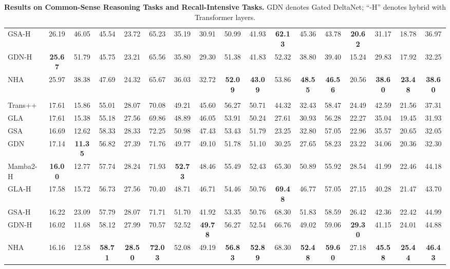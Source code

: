 \begin{table}[t!]
\begin{adjustbox}{width=1.05\textwidth, center}
\begin{small}
\begin{tabular}{lcc|cccccc>{\columncolor{red!7}}c|cccccc>{\columncolor{red!7}}c}
        GSA-H    & 26.19 & 46.05 & 45.54 & 23.72 & 65.23 & 35.19 & 30.91 & 50.99 & 41.93 & \textbf{62.13} & 45.36 & 43.78 & \textbf{20.62} & 31.17 & 18.78 & 36.97 \\
        GDN-H    & \textbf{25.67} & 51.79 & 45.75 & 23.21 & 65.56 & 35.80 & 29.30 & 51.38 & 41.83 & 52.32 & 38.80 & 39.40 & 15.24 & 29.83 & 17.92 & 32.25 \\
        NHA      & 25.97 & 38.38 & 47.69 & 24.32 & 65.67 & 36.03 & 32.72 & \textbf{52.09} & \textbf{43.09} & 53.86 & \textbf{48.55} & \textbf{46.56} & 20.56 & \textbf{38.60} & \textbf{23.48} & \textbf{38.60} \\
        \midrule
        \rowcolor{gray!15}\multicolumn{17}{l}{\textbf{\textit{1.3B Params 100B Tokens}}} \\
        Trans++  & 17.61 & 15.86 & 55.01 & 28.07 & 70.08 & 49.21 & 45.60 & 56.27 & 50.71 & 44.32 & 32.43 & 58.47 & 24.49 & 42.59 & 21.56 & 37.31 \\
        \midrule
        GLA      & 17.61 & 15.38 & 55.18 & 27.56 & 69.86 & 48.89 & 46.05 & 53.91 & 50.24 & 27.61 & 30.93 & 56.28 & 22.27 & 35.04 & 19.45 & 31.93 \\
        GSA      & 16.69 & 12.62 & 58.33 & 28.33 & 72.25 & 50.98 & 47.43 & 53.43 & 51.79 & 23.25 & 32.80 & 57.05 & 22.96 & 35.57 & 20.65 & 32.05 \\
        GDN      & 17.14 & \textbf{11.35} & 56.82 & 27.39 & 71.76 & 49.77 & 49.10 & 51.78 & 51.10 & 30.25 & 27.65 & 58.23 & 23.22 & 34.06 & 20.36 & 32.30 \\
        \midrule
        Mamba2-H & \textbf{16.00} & 12.77 & 57.74 & 28.24 & 71.93 & \textbf{52.73} & 48.46 & 55.49 & 52.43 & 65.30 & 50.89 & 55.92 & 28.54 & 41.99 & 22.46 & 44.18 \\
        GLA-H    & 17.58 & 15.72 & 56.73 & 27.56 & 70.40 & 48.71 & 46.71 & 54.46 & 50.76 & \textbf{69.48} & 46.77 & 57.05 & 27.15 & 40.28 & 21.47 & 43.70 \\
        GSA-H    & 16.22 & 23.09 & 57.79 & 28.07 & 71.71 & 51.70 & 41.92 & 53.35 & 50.76 & 68.30 & 51.83 & 58.59 & 26.42 & 42.36 & 22.42 & 44.99 \\
        GDN-H    & 16.02 & 11.68 & 58.12 & 27.99 & 70.57 & 52.52 & \textbf{49.78} & 56.27 & 52.54 & 66.76 & 49.02 & 59.06 & \textbf{29.30} & 41.15 & 24.01 & 44.88 \\
        NHA      & 16.16 & 12.58 & \textbf{58.71} & \textbf{28.50} & \textbf{72.03} & 52.08 & 49.19 & \textbf{56.83} & \textbf{52.89} & 68.30 & \textbf{52.48} & \textbf{59.60} & 27.18 & \textbf{45.58} & \textbf{25.44} & \textbf{46.43} \\
        \bottomrule
    \end{tabular}
    \end{small}
    \end{adjustbox}
    \caption{\textbf{Results on Common-Sense Reasoning Tasks and Recall-Intensive Tasks.} GDN denotes Gated DeltaNet; “-H” denotes hybrid with Transformer layers.}
    \label{table:combined_results}
\end{table}
